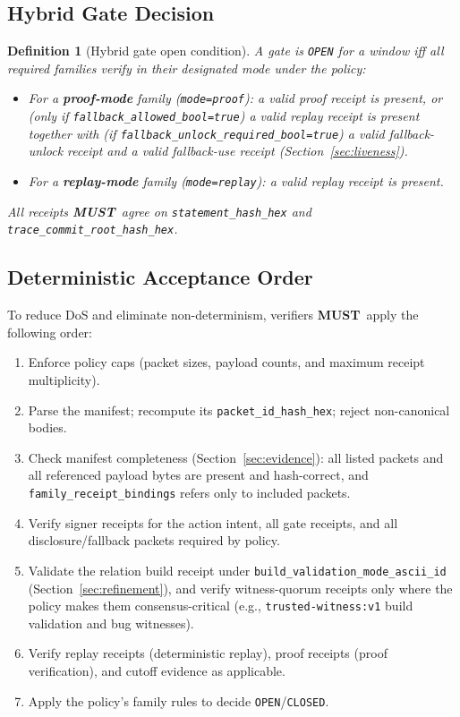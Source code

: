 \documentclass[11pt]{article}
\newcommand{\MUST}{\textbf{MUST}}
\newtheorem{definition}{Definition}
\begin{document}
\subsection{Hybrid Gate Decision}

\begin{definition}[Hybrid gate open condition]
A gate is \texttt{OPEN} for a window iff all required families verify in their designated mode under the policy:
\begin{itemize}[leftmargin=1.2em]
  \item For a \textbf{proof-mode} family (\texttt{mode=proof}): a valid proof receipt is present, \emph{or} (only if \texttt{fallback\_allowed\_bool=true}) a valid replay receipt is present together with (if \texttt{fallback\_unlock\_required\_bool=true}) a valid fallback-unlock receipt and a valid fallback-use receipt (Section~\ref{sec:liveness}).
  \item For a \textbf{replay-mode} family (\texttt{mode=replay}): a valid replay receipt is present.
\end{itemize}
All receipts \MUST\ agree on \texttt{statement\_hash\_hex} and \texttt{trace\_commit\_root\_hash\_hex}.
\end{definition}

\subsection{Deterministic Acceptance Order}

To reduce DoS and eliminate non-determinism, verifiers \MUST\ apply the following order:
\begin{enumerate}[leftmargin=1.8em]
  \item Enforce policy caps (packet sizes, payload counts, and maximum receipt multiplicity).
  \item Parse the manifest; recompute its \texttt{packet\_id\_hash\_hex}; reject non-canonical bodies.
  \item Check manifest completeness (Section~\ref{sec:evidence}): all listed packets and all referenced payload bytes are present and hash-correct, and \texttt{family\_receipt\_bindings} refers only to included packets.
  \item Verify signer receipts for the action intent, all gate receipts, and all disclosure/fallback packets required by policy.
  \item Validate the relation build receipt under \texttt{build\_validation\_mode\_ascii\_id} (Section~\ref{sec:refinement}), and verify witness-quorum receipts only where the policy makes them consensus-critical (e.g., \texttt{trusted-witness:v1} build validation and bug witnesses).
  \item Verify replay receipts (deterministic replay), proof receipts (proof verification), and cutoff evidence as applicable.
  \item Apply the policy's family rules to decide \texttt{OPEN}/\texttt{CLOSED}.
\end{enumerate}
\end{document}
